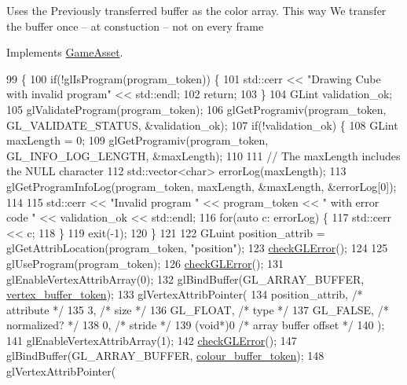 Uses the Previously transferred buffer as the color array. This way We transfer the buffer once -- at constuction -- not on every frame

Implements \hyperlink{classGameAsset_a961aa51ca0a9961fc584c0b5d5431300}{Game\+Asset}.


\begin{DoxyCode}
99                                          \{
100   \textcolor{keywordflow}{if}(!glIsProgram(program\_token)) \{
101     std::cerr << \textcolor{stringliteral}{"Drawing Cube with invalid program"} << std::endl;
102     \textcolor{keywordflow}{return};
103   \}
104   GLint validation\_ok;
105   glValidateProgram(program\_token);
106   glGetProgramiv(program\_token, GL\_VALIDATE\_STATUS, &validation\_ok);
107   \textcolor{keywordflow}{if}(!validation\_ok) \{
108     GLint maxLength = 0;
109     glGetProgramiv(program\_token, GL\_INFO\_LOG\_LENGTH, &maxLength);
110 
111     \textcolor{comment}{// The maxLength includes the NULL character}
112     std::vector<char> errorLog(maxLength);
113     glGetProgramInfoLog(program\_token, maxLength, &maxLength, &errorLog[0]);
114 
115     std::cerr << \textcolor{stringliteral}{"Invalid program "} << program\_token << \textcolor{stringliteral}{" with error code "} << validation\_ok << std::endl;
116     \textcolor{keywordflow}{for}(\textcolor{keyword}{auto} c: errorLog) \{
117       std::cerr << c;
118     \}
119     exit(-1);
120   \}
121 
122   GLuint position\_attrib = glGetAttribLocation(program\_token, \textcolor{stringliteral}{"position"});
123   \hyperlink{CubeAsset_8cc_a75f201b0e53e68726854997957322b8d}{checkGLError}();
124 
125   glUseProgram(program\_token);
126   \hyperlink{CubeAsset_8cc_a75f201b0e53e68726854997957322b8d}{checkGLError}();
131   glEnableVertexAttribArray(0);
132   glBindBuffer(GL\_ARRAY\_BUFFER, \hyperlink{classCubeAsset_a31bd098f60e2c24988316a9cc9335987}{vertex\_buffer\_token});
133   glVertexAttribPointer(
134     position\_attrib,        \textcolor{comment}{/* attribute */}
135     3,        \textcolor{comment}{/* size */}
136     GL\_FLOAT,   \textcolor{comment}{/* type */}
137     GL\_FALSE,   \textcolor{comment}{/* normalized? */}
138     0,        \textcolor{comment}{/* stride */}
139     (\textcolor{keywordtype}{void}*)0    \textcolor{comment}{/* array buffer offset */}
140   );
141   glEnableVertexAttribArray(1);
142   \hyperlink{CubeAsset_8cc_a75f201b0e53e68726854997957322b8d}{checkGLError}();
147   glBindBuffer(GL\_ARRAY\_BUFFER, \hyperlink{classCubeAsset_a75f98d346175cd91cdee04f1885f5327}{colour\_buffer\_token});
148   glVertexAttribPointer(

\end{DoxyCode}
